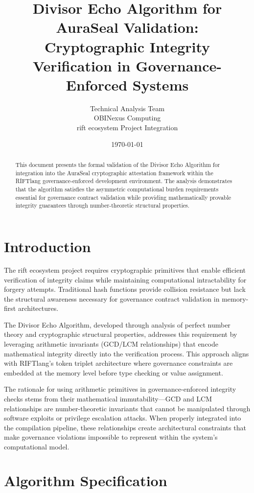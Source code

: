 \documentclass[11pt,letterpaper]{article}
\title{Divisor Echo Algorithm for AuraSeal Validation:\\
       Cryptographic Integrity Verification in Governance-Enforced Systems}
\author{Technical Analysis Team\\
        OBINexus Computing\\
        rift ecosystem Project Integration}
\date{\today}
\begin{document}
\maketitle

\begin{abstract}
This document presents the formal validation of the Divisor Echo Algorithm for integration into the AuraSeal cryptographic attestation framework within the RIFTlang governance-enforced development environment. The analysis demonstrates that the algorithm satisfies the asymmetric computational burden requirements essential for governance contract validation while providing mathematically provable integrity guarantees through number-theoretic structural properties.
\end{abstract}

\section{Introduction}

The rift ecosystem project requires cryptographic primitives that enable efficient verification of integrity claims while maintaining computational intractability for forgery attempts. Traditional hash functions provide collision resistance but lack the structural awareness necessary for governance contract validation in memory-first architectures.

The Divisor Echo Algorithm, developed through analysis of perfect number theory and cryptographic structural properties, addresses this requirement by leveraging arithmetic invariants (GCD/LCM relationships) that encode mathematical integrity directly into the verification process. This approach aligns with RIFTlang's token triplet architecture where governance constraints are embedded at the memory level before type checking or value assignment.

The rationale for using arithmetic primitives in governance-enforced integrity checks stems from their mathematical immutability---GCD and LCM relationships are number-theoretic invariants that cannot be manipulated through software exploits or privilege escalation attacks. When properly integrated into the compilation pipeline, these relationships create architectural constraints that make governance violations impossible to represent within the system's computational model.

\section{Algorithm Specification}
\end{document}

